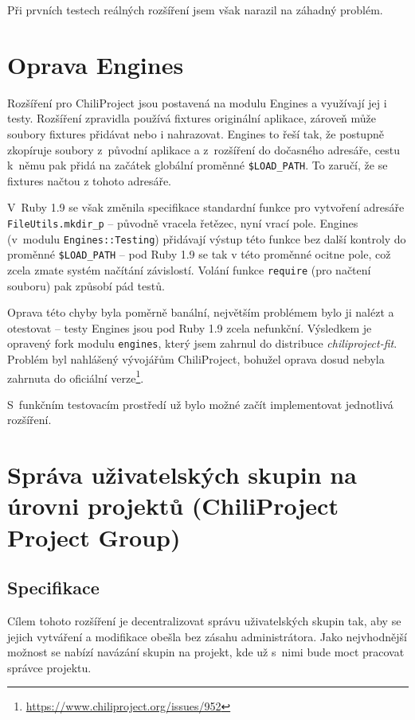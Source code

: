 \documentclass[thesis=B,czech]{FITthesis}[2012/05/02]
\begin{document}
Při prvních testech reálných rozšíření jsem však narazil na záhadný
problém.

\section{Oprava Engines}
\label{sec:oprava-engines}

Rozšíření pro ChiliProject jsou postavená na modulu Engines a
využívají jej i testy. Rozšíření zpravidla používá
\gls{fixtures} originální aplikace, zároveň může soubory fixtures
přidávat nebo i nahrazovat. Engines to řeší tak, že postupně zkopíruje
soubory z~původní aplikace a z~rozšíření do dočasného adresáře, cestu
k~němu pak přidá na začátek globální proměnné
\lstinline!$LOAD_PATH!. To zaručí, že se fixtures načtou z tohoto
adresáře.

V~Ruby 1.9 se však změnila specifikace standardní funkce pro vytvoření
adresáře \lstinline!FileUtils.mkdir_p! -- původně vracela řetězec, nyní
vrací pole. Engines (v~modulu \lstinline!Engines::Testing!) přidávají
výstup této funkce bez další kontroly do proměnné \lstinline!$LOAD_PATH!
-- pod Ruby 1.9 se tak v této proměnné ocitne pole, což zcela zmate
systém načítání závislostí. Volání funkce \lstinline!require! (pro
načtení souboru) pak způsobí pád testů.

Oprava této chyby byla poměrně banální, největším problémem bylo ji
nalézt a otestovat -- testy Engines jsou pod Ruby 1.9 zcela nefunkční.
Výsledkem je opravený \gls{fork} modulu \lstinline!engines!, který jsem
zahrnul do distribuce \emph{chiliproject-fit}. Problém byl
nahlášený vývojářům ChiliProject, bohužel oprava dosud nebyla zahrnuta
do oficiální verze\footnote{\url{https://www.chiliproject.org/issues/952}}.

S~funkčním testovacím prostředí už bylo možné začít implementovat
jednotlivá rozšíření.

\section[Správa uživatelských skupin na úrovni projektů]{Správa uživatelských skupin na úrovni projektů (ChiliProject
Project Group)}
\label{sec:project_group}

\subsection{Specifikace}

Cílem tohoto rozšíření je decentralizovat správu uživatelských skupin
tak, aby se jejich vytváření a modifikace obešla bez zásahu
administrátora. Jako nejvhodnější možnost se nabízí navázání skupin na
projekt, kde už s~nimi bude moct pracovat správce projektu.
\end{document}
